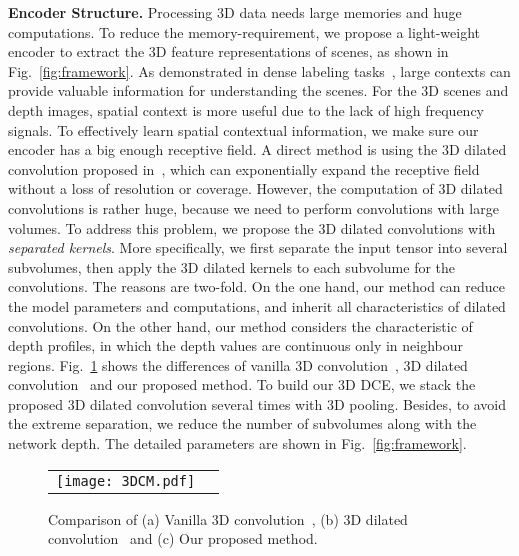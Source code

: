 \documentclass[10pt,twocolumn,letterpaper]{article}
\begin{document}
\textbf{Encoder Structure.}
Processing 3D data needs large memories and huge computations.
To reduce the memory-requirement, we propose a light-weight encoder to extract the 3D feature representations of scenes, as shown in Fig.~\ref{fig:framework}.
As demonstrated in dense labeling tasks~\cite{zhao2017pyramid,zhang2018agile,chen2018deeplab,zhang2019deep}, large contexts can provide valuable information for understanding the scenes.
For the 3D scenes and depth images, spatial context is more useful due to the lack of high frequency signals.
To effectively learn spatial contextual information, we make sure our encoder has a big enough receptive field.
A direct method is using the 3D dilated convolution proposed in~\cite{yu2016multi,song2017semantic}, which can exponentially expand the receptive field without a loss of resolution or coverage.
However, the computation of 3D dilated convolutions is rather huge, because we need to perform convolutions with large volumes.
To address this problem, we propose the 3D dilated convolutions with \emph{separated kernels}.
More specifically, we first separate the input tensor into several subvolumes, then apply the 3D dilated kernels to each subvolume for the convolutions.
The reasons are two-fold. On the one hand, our method can reduce the model parameters and computations, and inherit all characteristics of dilated convolutions.
On the other hand, our method considers the characteristic of depth profiles, in which the depth values are continuous only in neighbour regions.
Fig.~\ref{fig:dce} shows the differences of vanilla 3D convolution~\cite{ji20133d}, 3D dilated convolution~\cite{song2017semantic} and our proposed method.
To build our 3D DCE, we stack the proposed 3D dilated convolution several times with 3D pooling.
Besides, to avoid the extreme separation, we reduce the number of subvolumes along with the network depth.
The detailed parameters are shown in Fig.~\ref{fig:framework}.
\begin{figure}
\centering
\resizebox{0.5\textwidth}{!}
{
\begin{tabular}{@{}c@{}c@{}}
\texttt{[image: 3DCM.pdf]} \\
\end{tabular}
}
\caption{Comparison of (a) Vanilla 3D convolution~\cite{ji20133d}, (b) 3D dilated convolution~\cite{song2017semantic} and (c) Our proposed method.}
\vspace{-4mm}
\label{fig:dce}
\end{figure}
\vspace{-2mm}
\end{document}
